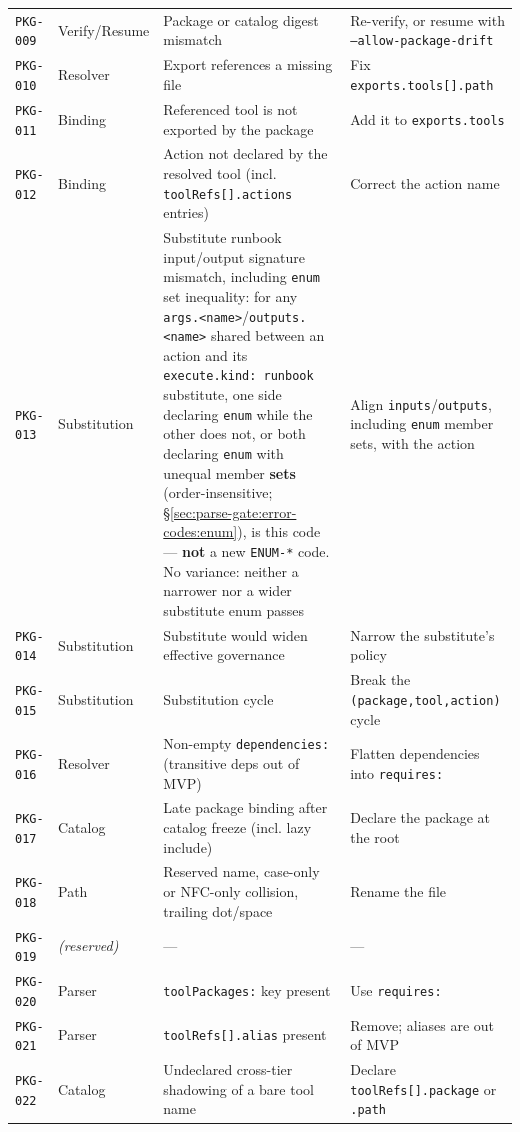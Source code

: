\begin{center}
\begin{tabular}{p{2.3cm}p{1.9cm}p{6.3cm}p{3.6cm}}
\texttt{PKG-009} & Verify/Resume & Package or catalog digest mismatch & Re-verify, or resume with \texttt{--allow-package-drift} \\
\texttt{PKG-010} & Resolver & Export references a missing file & Fix \texttt{exports.tools[].path} \\
\texttt{PKG-011} & Binding & Referenced tool is not exported by the package & Add it to \texttt{exports.tools} \\
\texttt{PKG-012} & Binding & Action not declared by the resolved tool (incl. \texttt{toolRefs[].actions} entries) & Correct the action name \\
\texttt{PKG-013} & Substitution & Substitute runbook input/output signature mismatch, including \texttt{enum} set inequality: for any \texttt{args.<name>}/\texttt{outputs.<name>} shared between an action and its \texttt{execute.kind: runbook} substitute, one side declaring \texttt{enum} while the other does not, or both declaring \texttt{enum} with unequal member \textbf{sets} (order-insensitive; \S\ref{sec:parse-gate:error-codes:enum}), is this code --- \textbf{not} a new \texttt{ENUM-*} code. No variance: neither a narrower nor a wider substitute enum passes & Align \texttt{inputs}/\texttt{outputs}, including \texttt{enum} member sets, with the action \\
\texttt{PKG-014} & Substitution & Substitute would widen effective governance & Narrow the substitute's policy \\
\texttt{PKG-015} & Substitution & Substitution cycle & Break the \texttt{(package,tool,action)} cycle \\
\texttt{PKG-016} & Resolver & Non-empty \texttt{dependencies:} (transitive deps out of MVP) & Flatten dependencies into \texttt{requires:} \\
\texttt{PKG-017} & Catalog & Late package binding after catalog freeze (incl. lazy include) & Declare the package at the root \\
\texttt{PKG-018} & Path & Reserved name, case-only or NFC-only collision, trailing dot/space & Rename the file \\
\texttt{PKG-019} & \textit{(reserved)} & --- & --- \\
\texttt{PKG-020} & Parser & \texttt{toolPackages:} key present & Use \texttt{requires:} \\
\texttt{PKG-021} & Parser & \texttt{toolRefs[].alias} present & Remove; aliases are out of MVP \\
\texttt{PKG-022} & Catalog & Undeclared cross-tier shadowing of a bare tool name & Declare \texttt{toolRefs[].package} or \texttt{.path} \\

\end{tabular}
\end{center}

